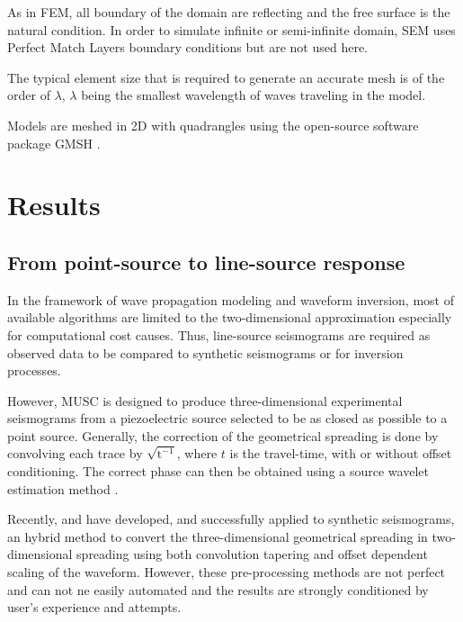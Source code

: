 \documentclass[manuscript,revised]{geophysics}
\newcommand{\twod}{two-dimensional }
\newcommand{\thrd}{three-dimensional }
\begin{document}
\noindent As in FEM, all boundary of the domain are reflecting and the free surface is the natural condition.  In order to simulate infinite or semi-infinite domain, SEM uses Perfect Match Layers boundary conditions \citep{Berenger_PML_1994,Festa_PML_2005} but are not used here.
 
\noindent The typical element size that is required to generate an accurate mesh is of the order of $\lambda$, $\lambda$ being the smallest wavelength of waves traveling in the model.

\noindent Models are meshed in 2D with quadrangles using the open-source software package GMSH \citep{Geuzaine_MSH_2009}. 

\section{Results}

\subsection{From point-source to line-source response}

\noindent In the framework of wave propagation modeling and waveform inversion, most of available algorithms are limited to the \twod approximation especially for computational cost causes. Thus, line-source seismograms are required as observed data to be compared to synthetic seismograms or for inversion processes.

\noindent However, MUSC is designed to produce \thrd experimental seismograms from a piezoelectric source selected to be as closed as possible to a point source. Generally, the correction of the geometrical spreading is done by convolving each trace by $\mathrm{\sqrt{t^{-1}}}$, where $t$ is the travel-time, with or without offset conditioning. The correct phase can then be obtained using a source wavelet estimation method \citep{Bretaudeau_SSM_2011}.

\noindent Recently, \citet{Forbriger_LSS_2014} and \citet{Schafer_LSS_2014} have developed, and successfully applied to synthetic seismograms, an hybrid method to convert the \thrd geometrical spreading in \twod spreading using both convolution tapering and offset dependent scaling of the waveform. However, these pre-processing methods are not perfect and can not ne easily automated and the results are strongly conditioned by user's experience and attempts.
\end{document}
